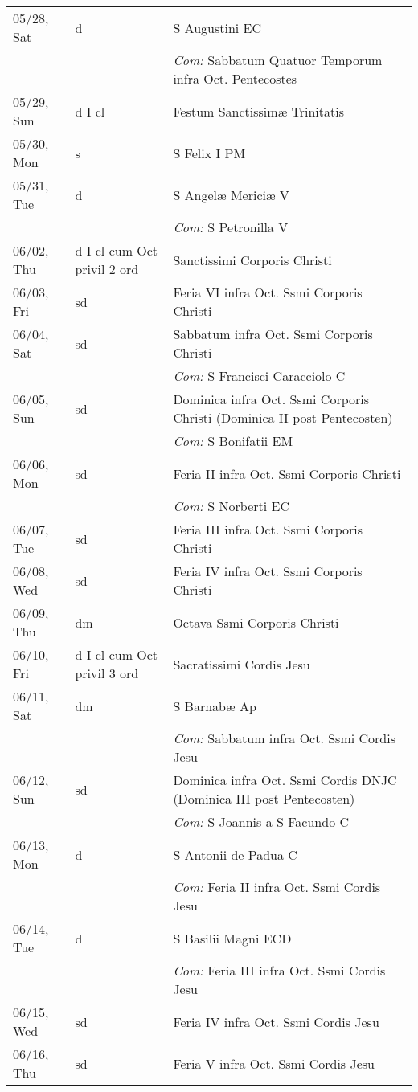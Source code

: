 \documentclass[10pt]{article}
\begin{document}
\begin{longtable}{ l l l }
05/28, Sat & d & S Augustini EC\\
 & & \textit{Com:} Sabbatum Quatuor Temporum infra Oct. Pentecostes\\
05/29, Sun & d I cl & Festum Sanctissimæ Trinitatis\\
05/30, Mon & s & S Felix I PM\\
05/31, Tue & d & S Angelæ Mericiæ V\\
 & & \textit{Com:} S Petronilla V\\
06/02, Thu & d I cl cum Oct privil 2 ord & Sanctissimi Corporis Christi\\
06/03, Fri & sd & Feria VI infra Oct. Ssmi Corporis Christi\\
06/04, Sat & sd & Sabbatum infra Oct. Ssmi Corporis Christi\\
 & & \textit{Com:} S Francisci Caracciolo C\\
06/05, Sun & sd & Dominica infra Oct. Ssmi Corporis Christi (Dominica II post Pentecosten)\\
 & & \textit{Com:} S Bonifatii EM\\
06/06, Mon & sd & Feria II infra Oct. Ssmi Corporis Christi\\
 & & \textit{Com:} S Norberti EC\\
06/07, Tue & sd & Feria III infra Oct. Ssmi Corporis Christi\\
06/08, Wed & sd & Feria IV infra Oct. Ssmi Corporis Christi\\
06/09, Thu & dm & Octava Ssmi Corporis Christi\\
06/10, Fri & d I cl cum Oct privil 3 ord & Sacratissimi Cordis Jesu\\
06/11, Sat & dm & S Barnabæ Ap\\
 & & \textit{Com:} Sabbatum infra Oct. Ssmi Cordis Jesu\\
06/12, Sun & sd & Dominica infra Oct. Ssmi Cordis DNJC (Dominica III post Pentecosten)\\
 & & \textit{Com:} S Joannis a S Facundo C\\
06/13, Mon & d & S Antonii de Padua C\\
 & & \textit{Com:} Feria II infra Oct. Ssmi Cordis Jesu\\
06/14, Tue & d & S Basilii Magni ECD\\
 & & \textit{Com:} Feria III infra Oct. Ssmi Cordis Jesu\\
06/15, Wed & sd & Feria IV infra Oct. Ssmi Cordis Jesu\\
06/16, Thu & sd & Feria V infra Oct. Ssmi Cordis Jesu\\

\end{longtable}
\end{document}
